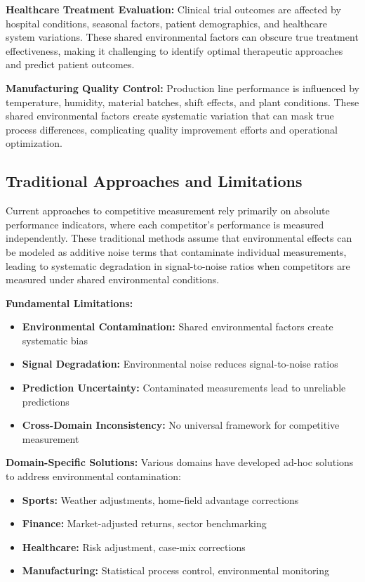 \textbf{Healthcare Treatment Evaluation:}
Clinical trial outcomes are affected by hospital conditions, seasonal factors, patient demographics, and healthcare system variations. These shared environmental factors can obscure true treatment effectiveness, making it challenging to identify optimal therapeutic approaches and predict patient outcomes.

\textbf{Manufacturing Quality Control:}
Production line performance is influenced by temperature, humidity, material batches, shift effects, and plant conditions. These shared environmental factors create systematic variation that can mask true process differences, complicating quality improvement efforts and operational optimization.

\subsection{Traditional Approaches and Limitations}

Current approaches to competitive measurement rely primarily on absolute performance indicators, where each competitor's performance is measured independently. These traditional methods assume that environmental effects can be modeled as additive noise terms that contaminate individual measurements, leading to systematic degradation in signal-to-noise ratios when competitors are measured under shared environmental conditions.

\textbf{Fundamental Limitations:}
\begin{itemize}
    \item \textbf{Environmental Contamination:} Shared environmental factors create systematic bias
    \item \textbf{Signal Degradation:} Environmental noise reduces signal-to-noise ratios
    \item \textbf{Prediction Uncertainty:} Contaminated measurements lead to unreliable predictions
    \item \textbf{Cross-Domain Inconsistency:} No universal framework for competitive measurement
\end{itemize}

\textbf{Domain-Specific Solutions:}
Various domains have developed ad-hoc solutions to address environmental contamination:
\begin{itemize}
    \item \textbf{Sports:} Weather adjustments, home-field advantage corrections \cite{forrest2000forecasting, boulier2003predicting}
    \item \textbf{Finance:} Market-adjusted returns, sector benchmarking \cite{fama1993common}
    \item \textbf{Healthcare:} Risk adjustment, case-mix corrections \cite{hanushek2010generalizations}
    \item \textbf{Manufacturing:} Statistical process control, environmental monitoring
\end{itemize}

